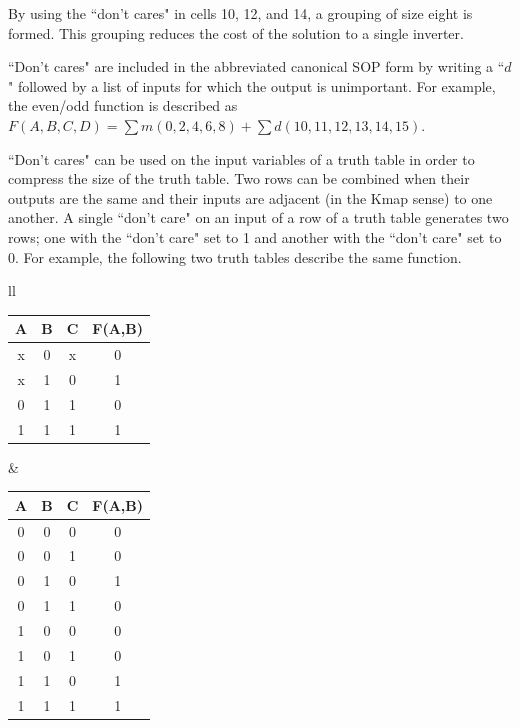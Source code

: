 \begin{process:minimizationKmap}

By using the ``don't cares" in cells 10, 12, and 14, a grouping of
size eight is formed.  This grouping reduces the cost of the solution
to a single inverter.

``Don't cares" are included in the abbreviated canonical SOP form by 
writing a ``$d$" followed by a list of inputs for which the output is
unimportant.  For example, the even/odd function is described 
as $F(A,B,C,D) = \sum m(0,2,4,6,8) + \sum d(10,11,12,13,14,15)$.

``Don't cares" can be used on the input variables of a truth table 
in order to compress the size of the truth table.  Two rows can
be combined when their outputs are the same and their inputs are
adjacent (in the Kmap sense) to one another.  A single ``don't care"
on an input of a row of a truth table generates two rows; one 
with the ``don't care" set to 1 and another with the ``don't care"
set to 0.  For example, the following two truth tables describe 
the same function.

\begin{tabular}{ll}
\begin{tabular}{c|c|c||c}
A & B & C & F(A,B) \\ \hline
x & 0 & x & 0 \\ \hline
x & 1 & 0 & 1 \\ \hline
0 & 1 & 1 & 0 \\ \hline
1 & 1 & 1 & 1 \\ 
\end{tabular} 

&

\begin{tabular}{c|c|c||c}
A & B & C & F(A,B) \\ \hline
0 & 0 & 0 & 0 \\ \hline
0 & 0 & 1 & 0 \\ \hline
0 & 1 & 0 & 1 \\ \hline
0 & 1 & 1 & 0 \\ \hline
1 & 0 & 0 & 0 \\ \hline
1 & 0 & 1 & 0 \\ \hline
1 & 1 & 0 & 1 \\ \hline
1 & 1 & 1 & 1 \\ 


\end{tabular}
\end{tabular}
\end{process:minimizationKmap}
